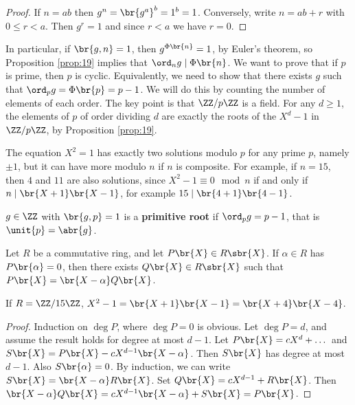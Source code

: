\begin{proof}
If $ n = ab $ then $ g^n = \br{g^a}^b = 1^b = 1 $. Conversely, write $ n = ab + r $ with $ 0 \le r < a $. Then $ g^r = 1 $ and since $ r < a $ we have $ r = 0 $.
\end{proof}

\pagebreak

In particular, if $ \br{g, n} = 1 $, then $ g^{\Phi\br{n}} = 1 $, by Euler's theorem, so Proposition \ref{prop:19} implies that $ \ord_n g \mid \Phi\br{n} $. We want to prove that if $ p $ is prime, then $ \unit{p} $ is cyclic. Equivalently, we need to show that there exists $ g $ such that $ \ord_p g = \Phi\br{p} = p - 1 $. We will do this by counting the number of elements of each order. The key point is that $ \ZZ / p\ZZ $ is a field. For any $ d \ge 1 $, the elements of $ \unit{p} $ of order dividing $ d $ are exactly the roots of the $ X^d - 1 $ in $ \ZZ / p\ZZ $, by Proposition \ref{prop:19}.

\begin{example*}
The equation $ X^2 = 1 $ has exactly two solutions modulo $ p $ for any prime $ p $, namely $ \pm 1 $, but it can have more modulo $ n $ if $ n $ is composite. For example, if $ n = 15 $, then $ 4 $ and $ 11 $ are also solutions, since $ X^2 - 1 \equiv 0 \mod n $ if and only if $ n \mid \br{X + 1}\br{X - 1} $, for example $ 15 \mid \br{4 + 1}\br{4 - 1} $.
\end{example*}

\begin{definition}
$ g \in \ZZ $ with $ \br{g, p} = 1 $ is a \textbf{primitive root} if $ \ord_p g = p - 1 $, that is $ \unit{p} = \abr{g} $.
\end{definition}

\begin{lemma}
\label{lem:21}
Let $ R $ be a commutative ring, and let $ P\br{X} \in R\sbr{X} $. If $ \alpha \in R $ has $ P\br{\alpha} = 0 $, then there exists $ Q\br{X} \in R\sbr{X} $ such that $ P\br{X} = \br{X - \alpha}Q\br{X} $.
\end{lemma}

\begin{example*}
If $ R = \ZZ / 15\ZZ $, $ X^2 - 1 = \br{X + 1}\br{X - 1} = \br{X + 4}\br{X - 4} $.
\end{example*}

\begin{proof}
Induction on $ \deg P $, where $ \deg P = 0 $ is obvious. Let $ \deg P = d $, and assume the result holds for degree at most $ d - 1 $. Let $ P\br{X} = cX^d + \dots $ and $ S\br{X} = P\br{X} - cX^{d - 1}\br{X - \alpha} $. Then $ S\br{X} $ has degree at most $ d - 1 $. Also $ S\br{\alpha} = 0 $. By induction, we can write $ S\br{X} = \br{X - \alpha}R\br{X} $. Set $ Q\br{X} = cX^{d - 1} + R\br{X} $. Then $ \br{X - \alpha}Q\br{X} = cX^{d - 1}\br{X - \alpha} + S\br{X} = P\br{X} $.
\end{proof}

